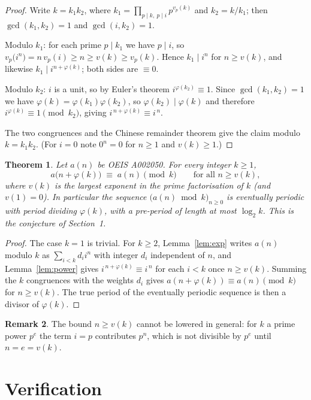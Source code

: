 \documentclass[11pt,a4paper]{article}
\theoremstyle{plain}
\newtheorem{theorem}{Theorem}
\theoremstyle{definition}
\newtheorem{remark}[theorem]{Remark}
\begin{document}
\begin{proof}
Write $k=k_1k_2$, where $k_1=\prod_{p\mid k,\ p\mid i}p^{v_p(k)}$ and $k_2=k/k_1$; then
$\gcd(k_1,k_2)=1$ and $\gcd(i,k_2)=1$.

Modulo $k_1$: for each prime $p\mid k_1$ we have $p\mid i$, so
$v_p\bigl(i^{n}\bigr)=n\,v_p(i)\ge n\ge v(k)\ge v_p(k)$. Hence $k_1\mid i^{n}$ for
$n\ge v(k)$, and likewise $k_1\mid i^{n+\varphi(k)}$; both sides are $\equiv 0$.

Modulo $k_2$: $i$ is a unit, so by Euler's theorem $i^{\varphi(k_2)}\equiv 1$. Since
$\gcd(k_1,k_2)=1$ we have $\varphi(k)=\varphi(k_1)\varphi(k_2)$, so
$\varphi(k_2)\mid\varphi(k)$ and therefore $i^{\varphi(k)}\equiv 1 \pmod{k_2}$, giving
$i^{\,n+\varphi(k)}\equiv i^{\,n}$.

The two congruences and the Chinese remainder theorem give the claim modulo $k=k_1k_2$.
(For $i=0$ note $0^{n}=0$ for $n\ge 1$ and $v(k)\ge1$.)
\end{proof}

\begin{theorem}\label{thm:main}
Let $a(n)$ be OEIS A002050. For every integer $k\ge1$,
\[
a\bigl(n+\varphi(k)\bigr)\;\equiv\;a(n)\pmod{k}\qquad\text{for all } n\ge v(k),
\]
where $v(k)$ is the largest exponent in the prime factorisation of $k$ (and $v(1)=0$).
In particular the sequence $\bigl(a(n)\bmod k\bigr)_{n\ge0}$ is eventually periodic with
period dividing $\varphi(k)$, with a pre-period of length at most $\log_2 k$. This is the
conjecture of Section~1.
\end{theorem}

\begin{proof}
The case $k=1$ is trivial. For $k\ge2$, Lemma~\ref{lem:exp} writes $a(n)$ modulo $k$ as
$\sum_{i<k}d_i i^{n}$ with integer $d_i$ independent of $n$, and Lemma~\ref{lem:power}
gives $i^{\,n+\varphi(k)}\equiv i^{\,n}$ for each $i<k$ once $n\ge v(k)$. Summing the
$k$ congruences with the weights $d_i$ gives
$a(n+\varphi(k))\equiv a(n)\pmod k$ for $n\ge v(k)$. The true period of the eventually
periodic sequence is then a divisor of $\varphi(k)$.
\end{proof}

\begin{remark}
The bound $n\ge v(k)$ cannot be lowered in general: for $k$ a prime power $p^{e}$ the
term $i=p$ contributes $p^{n}$, which is not divisible by $p^{e}$ until $n=e=v(k)$.
\end{remark}

\section{Verification}
\end{document}
